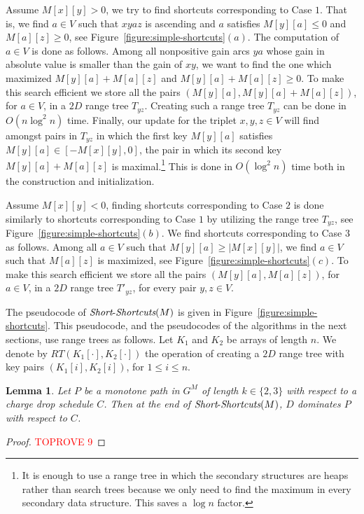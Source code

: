 \documentclass[11pt]{article}
\newtheorem{lemma}[theorem]{Lemma}
\newcommand{\Simple}{\mbox{{\it Short}-{\it Shortcuts}}}
\begin{document}
Assume $M[x][y]>0$, we try to find shortcuts corresponding to Case $1$. That is, we find $a\in V$ such that $xyaz$ is ascending and $a$ satisfies $M[y][a]\le 0$ and $M[a][z]\ge 0$, see Figure~\ref{figure:simple-shortcuts}$(a)$. The computation of $a\in V$ is done as follows. Among all nonpositive gain arcs $ya$ whose gain in absolute value is smaller than the gain of $xy$, we want to find the one which maximized
$M[y][a]+M[a][z]$ and $M[y][a]+M[a][z] \ge 0$. To make this search efficient we store all the pairs $(M[y][a], M[y][a]+M[a][z])$, for $a\in V$, in a $2D$ range tree $T_{yz}$. Creating such a range tree $T_{yz}$ can be done in $O(n\log^2 n)$ time.
Finally, our update for the triplet $x,y,z\in V$ will find amongst pairs in $T_{yz}$ in which the first key $M[y][a]$ satisfies $M[y][a]\in [-M[x][y],0]$, the pair in which its second key $M[y][a]+M[a][z]$ is maximal.\footnote{It is enough to use a range tree in which the secondary structures are heaps rather than search trees because we only need to find the maximum in every secondary data structure. This saves a $\log n$ factor.} This is done in $O(\log^2 n)$ time both in the construction and initialization.

Assume $M[x][y]<0$,
finding shortcuts corresponding to Case $2$ is done similarly to shortcuts corresponding to Case $1$ by utilizing the range tree $T_{yz}$, see Figure~\ref{figure:simple-shortcuts}$(b)$. We find shortcuts corresponding to Case $3$ as follows. Among all $a\in V$ such that $M[y][a] \ge |M[x][y]|$, we find $a\in V$ such that $M[a][z]$ is maximized, see Figure~\ref{figure:simple-shortcuts}$(c)$. To make this search efficient we store all the pairs $(M[y][a], M[a][z])$, for $a\in V$, in a $2D$ range tree $T'_{yz}$, for every pair $y,z\in V$.

The pseudocode of $\Simple(M)$ is given in Figure~\ref{figure:simple-shortcuts}. This pseudocode, and the pseudocodes of the algorithms in the next sections, use range trees as follows. Let $K_1$ and $K_2$ be arrays of length $n$. We denote by $RT(K_1[\cdot],K_2[\cdot])$ the operation of creating a $2D$ range tree with key pairs $(K_1[i],K_2[i])$, for $1\le i \le n$.

\begin{lemma}
    Let $P$ be a monotone path in $G^M$ of length $k\in\{2,3\}$ with respect to a charge drop schedule $C$. Then at the end of $\Simple(M)$, $D$ dominates $P$ with respect to $C$.
\end{lemma}

\begin{proof}\textcolor{red}{TOPROVE 9}\end{proof}
\end{document}
